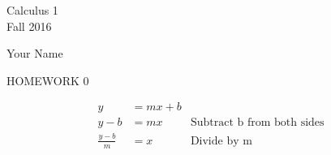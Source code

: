 \documentclass[11pt]{article}
\begin{document}
\begin{center}
Calculus 1\\
Fall 2016
\end{center}
\vspace{.1in}
\begin{center}
Your Name\\
\end{center}
\vspace{.01in}
\begin{center}
HOMEWORK 0\\
\end{center}

\vspace{.1in}

 \par
\begin{align*}
y &= m x + b & \\
y - b &= m x & \text{Subtract b from both sides}\\
\frac{y-b}{m} &= x & \text{Divide by m}
\end{align*}

\end{document}
